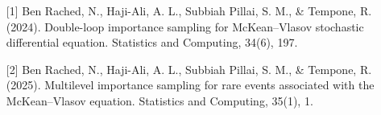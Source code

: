\begin{talk}
\begin{enumerate}
	\item[{[1]}] Ben Rached, N., Haji-Ali, A. L., Subbiah Pillai, S. M., \& Tempone, R. (2024). Double-loop importance sampling for McKean–Vlasov stochastic differential equation. Statistics and Computing, 34(6), 197.
	\item[{[2]}] Ben Rached, N., Haji-Ali, A. L., Subbiah Pillai, S. M., \& Tempone, R. (2025). Multilevel importance sampling for rare events associated with the McKean–Vlasov equation. Statistics and Computing, 35(1), 1.
\end{enumerate}

\end{talk}

